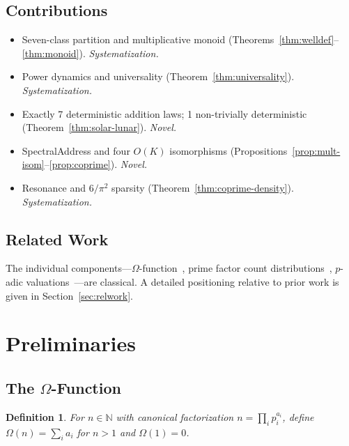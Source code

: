 \documentclass[10pt,twocolumn]{article}
\newtheorem{definition}[theorem]{Definition}
\newcommand{\Om}{\Omega}
\newcommand{\N}{\mathbb{N}}
\begin{document}
\subsection{Contributions}

\begin{itemize}[noitemsep, topsep=2pt]
\item[\textbf{C1}] Seven-class partition and multiplicative monoid
      (Theorems~\ref{thm:welldef}--\ref{thm:monoid}). \emph{Systematization.}
\item[\textbf{C2}] Power dynamics and universality (Theorem~\ref{thm:universality}). \emph{Systematization.}
\item[\textbf{C3}] Exactly 7 deterministic addition laws; 1 non-trivially
      deterministic (Theorem~\ref{thm:solar-lunar}). \emph{Novel.}
\item[\textbf{C4}] SpectralAddress and four $O(K)$ isomorphisms
      (Propositions~\ref{prop:mult-isom}--\ref{prop:coprime}). \emph{Novel.}
\item[\textbf{C5}] Resonance and $6/\pi^2$ sparsity (Theorem~\ref{thm:coprime-density}). \emph{Systematization.}
\end{itemize}

\subsection{Related Work}

The individual components---$\Om$-function~\cite{HardyWright1979,Tenenbaum2015},
prime factor count distributions~\cite{Sathe1953,Selberg1954},
$p$-adic valuations~\cite{Gouvea1997}---are classical.
A detailed positioning relative to prior work is given in Section~\ref{sec:relwork}.

\section{Preliminaries}

\subsection{The $\Omega$-Function}

\begin{definition}\label{def:omega}
For $n \in \N$ with canonical factorization $n = \prod_i p_i^{a_i}$,
define $\Om(n) = \sum_i a_i$ for $n > 1$ and $\Om(1) = 0$.
\end{definition}
\end{document}
